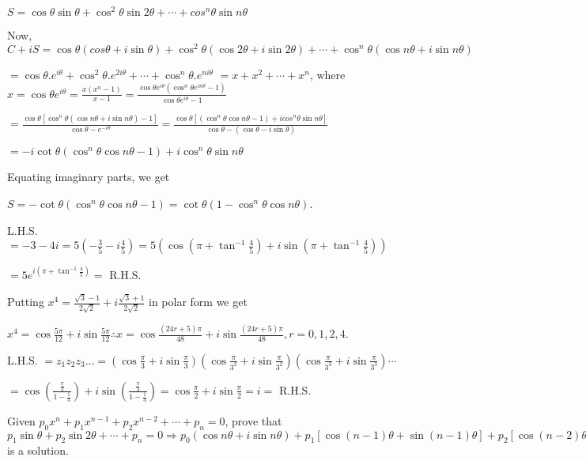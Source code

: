   $S = \cos\theta \sin\theta + \cos^2\theta \sin 2\theta + \cdots + cos^n\theta \sin n\theta$

  Now, $C + iS = \cos\theta(cos\theta + i \sin\theta) + \cos^2\theta(\cos2\theta + i \sin 2\theta) + \cdots
  + \cos^n\theta(\cos n\theta + i \sin n\theta)$

  $= \cos\theta.e^{i\theta} + \cos^2\theta.e^{2i\theta} + \cdots + \cos^n\theta.e^{ni\theta}$
  $= x + x^2 + \cdots + x^n$, where $x = \cos\theta e^{i\theta}= \frac{x(x^n - 1)}{x - 1} = \frac{\cos\theta
    e^{i\theta}(\cos^n\theta e^{in\theta} - 1)}{\cos\theta e^{i\theta} - 1}$

  $= \frac{\cos\theta[\cos^n\theta(\cos n\theta + i \sin n\theta) - 1]}{\cos\theta - e^{-i\theta}} =
  \frac{\cos\theta[(\cos^n\theta\cos n\theta -1) + i cos^n\theta\sin n\theta]}{\cos\theta - (\cos\theta
    - i\sin\theta)}$

  $= -i \cot\theta(\cos^n\theta \cos n\theta - 1) + i \cos^n\theta \sin n\theta$

  Equating imaginary parts, we get

  $S = -\cot\theta(\cos^n\theta \cos n\theta - 1) = \cot\theta(1 - \cos^n\theta\cos n\theta)$.
\item L.H.S. $= -3 -4i = 5\left(-\frac{3}{5} - i\frac{4}{5}\right) = 5\left(\cos\left(\pi +
  \tan^{-1}\frac{4}{5}\right) +i \sin\left(\pi + \tan^{-1}\frac{4}{5}\right)\right)$

  $= 5e^{i\left(\pi + \tan^{-1}\frac{4}{5}\right)} =$ R.H.S.
\item Putting $x^4 = \frac{\sqrt{3} - 1}{2\sqrt{2}} + i\frac{\sqrt{3} + 1}{2\sqrt{2}}$ in polar form we get

  $x^4 = \cos\frac{5\pi}{12} + i \sin\frac{5\pi}{12} \therefore x = \cos\frac{(24r + 5)\pi}{48} + i
  \sin\frac{(24r + 5)\pi}{48}, r = 0, 1, 2, 4$.
\item L.H.S. $= z_1z_2z_3\ldots = \left(\cos\frac{\pi}{3} +
  i\sin\frac{\pi}{3}\right)\left(\cos\frac{\pi}{3^2} + i\sin\frac{\pi}{3^2}\right)\left(\cos\frac{\pi}{3^3}
  + i\sin\frac{\pi}{3^3}\right)\cdots$

  $= \cos\left(\frac{\frac{\pi}{3}}{1 - \frac{1}{3}}\right) + i\sin\left(\frac{\frac{\pi}{3}}{1 -
    \frac{1}{3}}\right) = \cos\frac{\pi}{2} + i\sin\frac{\pi}{2} = i =$ R.H.S.
\item Given $p_0x^n + p_1x^{n - 1} + p_2x^{n - 2} + \cdots + p_n = 0$, prove that $p_1\sin\theta +
  p_2\sin2\theta + \cdots + p_n = 0 \Rightarrow p_0(\cos n\theta + i\sin n\theta) + p_1[\cos(n - 1)\theta +
    \sin(n - 1)\theta] + p_2[\cos(n - 2)\theta + i\sin(n - 2)\theta] + \cdots + p_n = 0\;[\because
    \cos\theta + i\sin\theta]$ is a solution.

